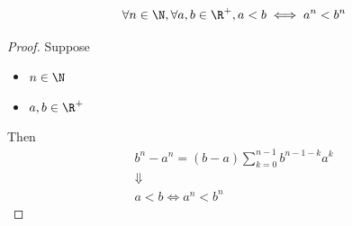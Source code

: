 \begin{lemma} \label{an1:lem:nth-power-is-monotone}
  \[
    \forall n \in \N, \forall a, b \in \R^{+}, a < b \iff a^{n} < b^{n}
  \]
\end{lemma}

\begin{proof}
  Suppose
  \begin{itemize}
    \item $n \in \N$
    \item $a, b \in \R^{+}$
  \end{itemize}
  Then
  \[
    \begin{array}{c}
      b^{n} - a^{n} = (b - a)\sum_{k = 0}^{n - 1} b^{n - 1 - k} a^{k} \\
      \Downarrow                                                      \\
      a < b \iff a^{n} < b^{n}
    \end{array}
  \]
\end{proof}
